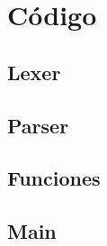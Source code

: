 \documentclass[a4paper,titlepage,10pt]{article}
\begin{document}
\section{Código}

\subsection{Lexer}


\subsection{Parser}


\subsection{Funciones}


\subsection{Main}

\end{document}
